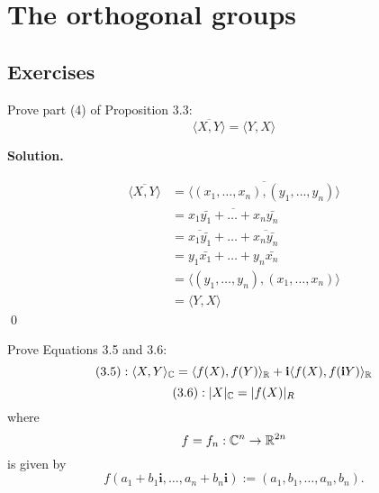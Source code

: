 \documentclass[12pt]{book}
\theoremstyle{definition}
\newenvironment{solution}
{%
  \par\noindent\textbf{Solution.}\quad
}
{%
  \qed\par
}
\begin{document}
\chapter{The orthogonal groups}
\section{Exercises}

\begin{taggedexercise}[Complete]
  Prove part (4) of Proposition 3.3:
  \[
  \overline{\langle X, Y \rangle} = \langle Y, X \rangle
  \]
\end{taggedexercise}
\begin{solution}
  \[
  \begin{aligned}
    \overline{\langle X, Y \rangle} &= \overline{\langle (x_1, \dots , x_n), (y_1, \dots , y_n) \rangle} \\
                                    &= \overline{x_1\bar{y_1} + \dots + x_n\bar{y_n}} \\
                                    &= \overline{x_1 \bar{y_1}} + \dots + \overline{x_n \bar{y_n}} \\
                                    &= y_1\bar{x_1} + \dots + y_n\bar{x_n} \\
                                    &= \langle (y_1, \dots , y_n), (x_1, \dots , x_n) \rangle \\
                                    &= \langle Y, X \rangle
  \end{aligned}
  \]
\end{solution}


\begin{taggedexercise}[Complete]
  Prove Equations 3.5 and 3.6:
  \[
    (3.5) :  \langle X, Y \rangle_{\mathbb{C}} = \langle f(X), f(Y) \rangle_{\mathbb{R}} + \mathbf{i} \langle f(X), f(\mathbf{i}Y) \rangle_{\mathbb{R}}
  \]
  \[
    (3.6) : |X|_{\mathbb{C}} = |f(X)|_R
  \]
  where
  \[
  f = f_n: \mathbb{C}^{n} \to \mathbb{R}^{2n}
  \]
  is given by
  \[
  f(a_1 + b_1\mathbf{i}, \dots , a_n+b_n\mathbf{i}) := (a_1, b_1, \dots, a_n, b_n).
  \]
\end{taggedexercise}
\end{document}
